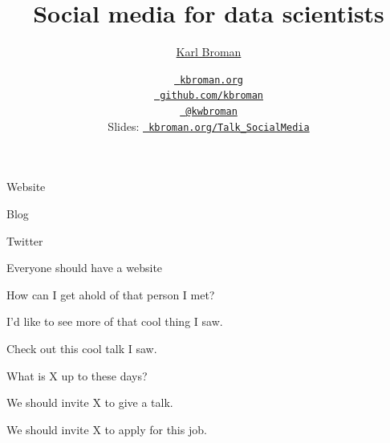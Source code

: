 \documentclass[12pt,t,aspectratio=169]{beamer}
\title{Social media for data scientists}
\subtitle{}
\author{\href{https://kbroman.org}{Karl Broman}}
\institute{Biostatistics \& Medical Informatics, UW{\textendash}Madison}
\date{\href{https://kbroman.org}{\tt \scriptsize \color{foreground} kbroman.org}
\\[-4pt]
\href{https://github.com/kbroman}{\tt \scriptsize \color{foreground} github.com/kbroman}
\\[-4pt]
\href{https://twitter.com/kwbroman}{\tt \scriptsize \color{foreground} @kwbroman}
\\[2pt]
\scriptsize {\lolit Slides:} \href{https://kbroman.org/Talk\_SocialMedia}{\tt \scriptsize
  \color{foreground} kbroman.org/Talk\_SocialMedia}
}
\begin{document}
{
 }



\begin{frame}{}

  \bbi
\item Website

\item Blog

\item Twitter
  \ei

\end{frame}





{

\begin{frame}[c]{}

\centerline{
\color{background}
  \Large Everyone should have a website
}


\end{frame}
}


\begin{frame}[c]{}

  \bbi
\item How can I get ahold of that person I met?
\item I'd like to see more of that cool thing I saw.
\item Check out this cool talk I saw.
\item What is X up to these days?
\item We should invite X to give a talk.
\item We should invite X to apply for this job.
  \ei

\end{frame}
\end{document}
